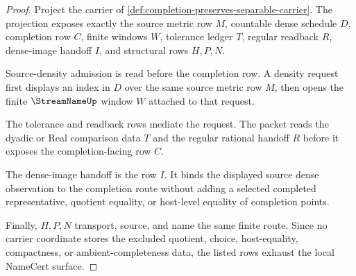 \begin{proof}
Project the carrier of \autoref{def:completion-preserves-separable-carrier}. The projection exposes exactly the source metric row $M$, countable dense schedule $D$, completion row $C$, finite windows $W$, tolerance ledger $T$, regular readback $R$, dense-image handoff $I$, and structural rows $H,P,N$.

Source-density admission is read before the completion row. A density request first displays an index in $D$ over the same source metric row $M$, then opens the finite $\StreamNameUp$ window $W$ attached to that request.

The tolerance and readback rows mediate the request. The packet reads the dyadic or Real comparison data $T$ and the regular rational handoff $R$ before it exposes the completion-facing row $C$.

The dense-image handoff is the row $I$. It binds the displayed source dense observation to the completion route without adding a selected completed representative, quotient equality, or host-level equality of completion points.

Finally, $H,P,N$ transport, source, and name the same finite route. Since no carrier coordinate stores the excluded quotient, choice, host-equality, compactness, or ambient-completeness data, the listed rows exhaust the local NameCert surface.
\end{proof}

